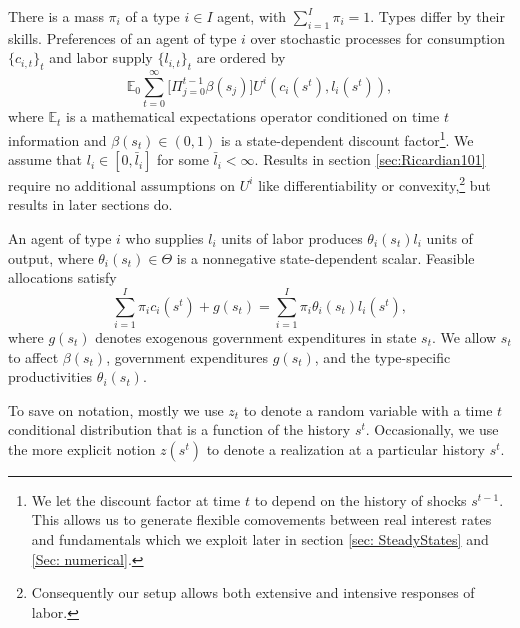 \documentclass[thmsb,11pt]{article}
\begin{document}
There is a mass $\pi _{i}$
of a type $i\in I$ agent, with $\sum_{i=1}^{I}\pi _{i}=1.$ Types differ by their skills.
Preferences of an
agent of type $i$ over stochastic processes for consumption $\{c_{i,t}\}_t$
and labor supply $\{l_{i,t}\}_t$ are ordered by
\begin{equation}
\mathbb{E}_{0}\sum_{t=0}^{\infty } \bigl[\Pi_{j=0}^{t-1}\beta(s_j)\bigr] U^{i}\left(
c_{i}(s^t),l_{i}(s^t)\right),  \label{utility lifetime}
\end{equation}%
where $\mathbb{E}_{t}$ is a mathematical expectations operator conditioned
on time $t$ information and $\beta(s_t) \in \left( 0,1\right) $ is a state-dependent discount
factor\footnote{We let the discount factor at time $t$ to depend on the history of shocks $s^{t-1}$. This allows us to generate flexible  comovements between real interest rates and fundamentals which we exploit later in section \ref{sec: SteadyStates} and \ref{Sec: numerical}. }. We assume that $l_{i}\in \left[ 0,\bar{l}_{i}\right] $ for some $%
\bar{l}_{i}<\infty .$ Results in section  \ref{sec:Ricardian101} require no
additional assumptions on $U^{i}$ like  differentiability or convexity,\footnote{Consequently  our setup allows both extensive and intensive responses of labor.}  but results in later sections do.

An agent of type $i$ who supplies $l_{i}$ units of labor produces $\theta
_{i}\left( s_t\right) l_{i}$ units of output, where $\theta _{i}(s_t)\in \Theta $
is a nonnegative state-dependent scalar. Feasible allocations satisfy
\begin{equation}%
\sum_{i=1}^{I}\pi_{i}c_{i}(s^t)+g\left( s_{t}\right) =\sum_{i=1}^{I}\pi
_{i}\theta _{i}\left( s_{t}\right) l_{i}(s^t),  \label{feasibility goods}
\end{equation}%
where $g\left( s_{t}\right) $ denotes exogenous government expenditures in
state $s_{t}.$
 We allow $s_t$ to
affect $\beta(s_t)$, government expenditures $g(s_t)$, and the type-specific productivities $\theta_i(s_t)$.

To save on notation, mostly we
use $z_{t}$ to denote a random variable with a time $t$ conditional
distribution that is a function of the history $s^{t}$.
 Occasionally, we use the more explicit notion $z\left(
s^{t}\right) $ to denote a realization  at
a particular history $s^{t}.$

\end{document}
